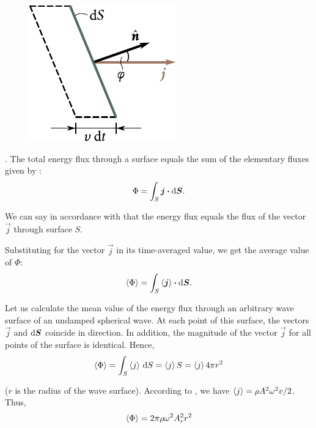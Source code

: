 \begin{figure}[t]
	\begin{center}
		\includegraphics[scale=0.95]{figures/ch_14/fig_14_9.pdf}
		\caption[]{}
		\label{fig:14_9}
	\end{center}
	\vspace{-0.9cm}
\end{figure}

.
The total energy flux through a surface equals the sum of the elementary fluxes given by :
\begin{equation}\label{eq:14_50}
	\Phi = \int_S \boldsymbol{j} \boldsymbol{\cdot} \mathrm{d}\boldsymbol{S}.
\end{equation}

\noindent
We can say in accordance with  that the energy flux equals the flux of the vector $\vec{j}$ through surface $S$.

Substituting for the vector $\vec{j}$ in  its time-averaged value, we get the average value of $\Phi$:
\begin{equation}\label{eq:14_51}
	\left\langle \Phi \right\rangle = \int_S \left\langle \boldsymbol{j} \right\rangle \boldsymbol{\cdot} \mathrm{d}\boldsymbol{S}.
\end{equation}

Let us calculate the mean value of the energy flux through an arbitrary wave surface of an undamped spherical wave.
At each point of this surface, the vectors $\vec{j}$ and $\mathrm{d}\boldsymbol{S}$ coincide in direction.
In addition, the magnitude of the vector $\vec{j}$ for all points of the surface is identical.
Hence,
\begin{equation*}
	\left\langle \Phi \right\rangle = \int_S \left\langle j \right\rangle\, \mathrm{d} S = \left\langle j \right\rangle S = \left\langle j \right\rangle 4\pi r^2
\end{equation*}

\noindent
($r$ is the radius of the wave surface).
According to , we have $\left\langle j \right\rangle=\rho A^2\omega^2v/2$.
Thus,
\begin{equation*}
	\left\langle \Phi \right\rangle = 2\pi \rho \omega^2 A_r^2 r^2
\end{equation*}

